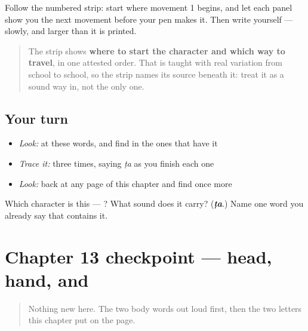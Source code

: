 Follow the numbered strip: start where movement 1 begins, and let each panel show you the next movement before your pen makes it. Then write  yourself — slowly, and larger than it is printed.

\begin{quote}
The strip shows \textbf{where to start the character and which way to travel}, in one attested order. That is taught with real variation from school to school, so the strip names its source beneath it: treat it as a sound way in, not the only one.
\end{quote}

\subsection*{Your turn}
\begin{itemize}
\raggedright
  \item \emph{Look:} at these words, and find  in the ones that have it
\end{itemize}

\begin{quote}
\end{quote}

\begin{itemize}
\raggedright
  \item \emph{Trace it:}  three times, saying \emph{ṭa} as you finish each one
  \item \emph{Look:} back at any page of this chapter and find  once more
\end{itemize}

\begin{tcolorbox}[breakable,colback=teal!4,colframe=teal!35!black,title={Before you move on}]
Which character is this — ? What sound does it carry? (\emph{\textbf{ṭa}}.) Name one word you already say that contains it.
\end{tcolorbox}
\section[Practice]{Chapter 13 checkpoint — head, hand,  and }

\label{lesson:ML-C13-checkpoint}



\begin{quote}
Nothing new here. The two body words out loud first, then the two letters this chapter put on the page.
\end{quote}


